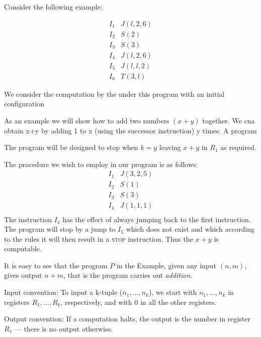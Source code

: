 Consider the following example:

\[
\begin{array}{ll}
I_1 &J(l,2,6) \\
I_2 &S(2) \\
I_3 &S(3) \\
I_4 &J(l,2,6)\\ 
I_5 &J(l,l,2) \\
I_6 &T(3,l) 
\end{array}
\]

We consider the computation by the \URM under this program with an initial configuration


\begin{Example}
As an example we will show how to add two numbers $(x+y)$ together. We cna obtain x+y by adding 1 to x (using the successor instruction) y times. A program 
\end{Example}



The program will be designed to stop when $k=y$ leaving $x+y$ in $R_1$ as required.

The procedure we wish to employ in our program is as follows:
\[
\begin{array}{ll}
I_1 &J(3,2,5) \\
I_2 &S(1) \\
I_3 &S(3) \\
I_4 &J(1,1,1)\\ 
\end{array}
\]
The instruction $I_4$ has the effect of always jumping back to the first instruction. The program will stop by a jump to $I_5$ which does not exist and which according to the \URM rules it will then result in a \textsc{stop} instruction. Thus the $x+y$ is computable. 

It is easy to see that the program $P$ in the Example, given any input  $(n,m)$, gives output $n+m$, that is the program carries out \emph{addition}.

\begin{tcolorbox}[colback=white]
Input convention: To input a k-tuple ($n_1,\dots, n_k$), we start with $n_1,\dots, n_k$
in registers $R_1,\dots,R_k$, respectively, and with $0$ in all the other registers.

Output convention: If a computation halts, the output is the number in
register $R_1$ — there is no output otherwise.
\end{tcolorbox}



